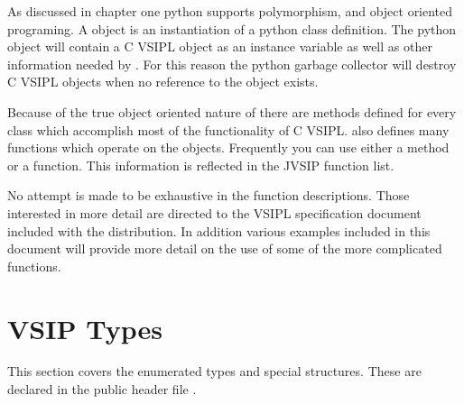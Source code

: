 As discussed in chapter one python supports polymorphism, and object oriented programing. A \pyjv{} object is an instantiation of a python class definition. The python object will contain a C VSIPL object as an instance variable as well as other information needed by \pyjv. For this reason the python garbage collector will destroy C VSIPL objects when no reference to the \pyjv{} object exists.

Because of the true object oriented nature of \pyjv{} there are methods defined for every class which accomplish most of the functionality of C VSIPL.  also defines many functions which operate on the \pyjv{} objects. Frequently you can use either a method or a function. This information is reflected in the JVSIP function list.

No attempt is made to be exhaustive in the function descriptions. Those interested in more detail are directed to the VSIPL specification document included with the \jv{} distribution. In addition various examples included in this document will provide more detail on the use of some of the more complicated functions.
%
   
   
     
   
   
   
      
      
      
      
      
      
      
      
      
   
      
      
      
      
      
   
      
      
    
%
\section*{VSIP Types}
This section covers the enumerated types and special structures. These are declared in the public header file .
%
